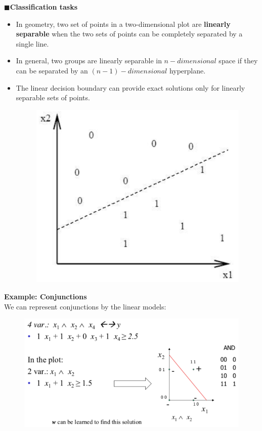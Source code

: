 \documentclass[../main.tex]{subfiles}
\begin{document}
\noindent$\blacksquare$\textbf{Classification tasks}
\begin{itemize}
    \item In geometry, two set of points in a two-dimensional plot are \textbf{linearly separable} when the two sets of points can be completely separated by a single line.
    \item In general, two groups are linearly separable in $n-dimensional$ space if they can be separated by an $(n-1)-dimensional$ hyperplane.
    \item The linear decision boundary can provide exact solutions only for linearly separable sets of points.
    \begin{figure}[H]
        \centering
        \includegraphics[scale = 0.2]{lectures/2_linear_model/2_linear_classifier_divide_right.png}
    \end{figure}
\end{itemize}

\textbf{Example: Conjunctions}\\
We can represent conjunctions by the linear models:
\begin{figure}[H]
    \centering
    \includegraphics[scale = 0.4]{lectures/2_linear_model/2_eg_conjunctions.png}
\end{figure}
\end{document}
